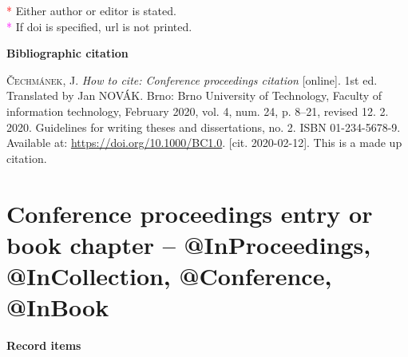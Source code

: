 \bigskip
\noindent \textcolor{red}{*} Either author or editor is stated. \\
\noindent \textcolor{magenta}{*} If doi is specified, url is not printed.

\bigskip

\bigskip

\noindent \textbf{Bibliographic citation}

\medskip

\noindent \textsc{Čechmánek}, J. \textit{How to cite: Conference proceedings citation} [online]. 1st ed. Translated by Jan NOVÁK.
Brno: Brno University of Technology, Faculty of information technology, February 2020, vol. 4, num. 24, p. 8–21, revised 12. 2. 2020. Guidelines for writing theses and dissertations, no. 2. ISBN 01-234-5678-9.  Available at: \url{https://doi.org/10.1000/BC1.0}. [cit. 2020-02-12]. This is a made up citation.
\newpage
\section*{Conference proceedings entry or book chapter -- @InProceedings, @InCollection, @Conference, @InBook}
\label{pr-kapitola}
\noindent \textbf{Record items}

\medskip

